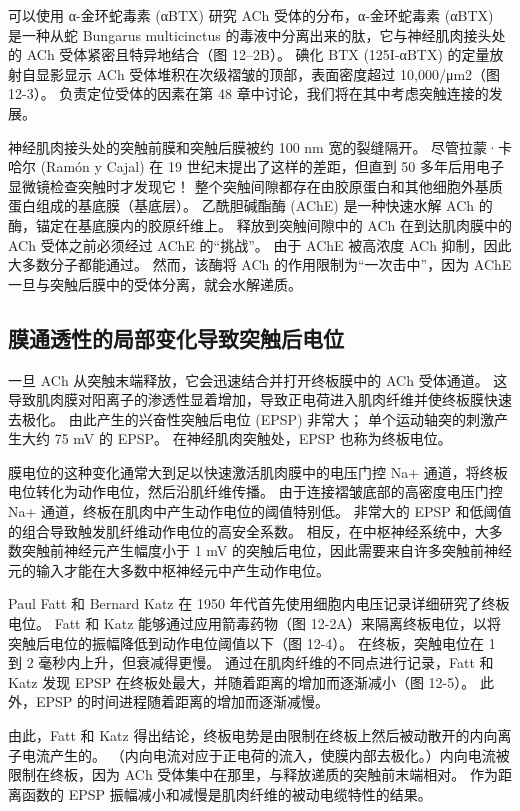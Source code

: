 可以使用 α-金环蛇毒素 (αBTX) 研究 ACh 受体的分布，α-金环蛇毒素 (αBTX) 是一种从蛇 Bungarus multicinctus 的毒液中分离出来的肽，它与神经肌肉接头处的 ACh 受体紧密且特异地结合（图 12–2B）。 碘化 BTX (125I-αBTX) 的定量放射自显影显示 ACh 受体堆积在次级褶皱的顶部，表面密度超过 10,000/μm2（图 12-3）。 负责定位受体的因素在第 48 章中讨论，我们将在其中考虑突触连接的发展。

神经肌肉接头处的突触前膜和突触后膜被约 100 nm 宽的裂缝隔开。 尽管拉蒙·卡哈尔 (Ramón y Cajal) 在 19 世纪末提出了这样的差距，但直到 50 多年后用电子显微镜检查突触时才发现它！ 整个突触间隙都存在由胶原蛋白和其他细胞外基质蛋白组成的基底膜（基底层）。 乙酰胆碱酯酶 (AChE) 是一种快速水解 ACh 的酶，锚定在基底膜内的胶原纤维上。 释放到突触间隙中的 ACh 在到达肌肉膜中的 ACh 受体之前必须经过 AChE 的“挑战”。 由于 AChE 被高浓度 ACh 抑制，因此大多数分子都能通过。 然而，该酶将 ACh 的作用限制为“一次击中”，因为 AChE 一旦与突触后膜中的受体分离，就会水解递质。


\subsection{膜通透性的局部变化导致突触后电位}
一旦 ACh 从突触末端释放，它会迅速结合并打开终板膜中的 ACh 受体通道。 这导致肌肉膜对阳离子的渗透性显着增加，导致正电荷进入肌肉纤维并使终板膜快速去极化。 由此产生的兴奋性突触后电位 (EPSP) 非常大； 单个运动轴突的刺激产生大约 75 mV 的 EPSP。 在神经肌肉突触处，EPSP 也称为终板电位。

膜电位的这种变化通常大到足以快速激活肌肉膜中的电压门控 Na+ 通道，将终板电位转化为动作电位，然后沿肌纤维传播。 由于连接褶皱底部的高密度电压门控 Na+ 通道，终板在肌肉中产生动作电位的阈值特别低。 非常大的 EPSP 和低阈值的组合导致触发肌纤维动作电位的高安全系数。 相反，在中枢神经系统中，大多数突触前神经元产生幅度小于 1 mV 的突触后电位，因此需要来自许多突触前神经元的输入才能在大多数中枢神经元中产生动作电位。

Paul Fatt 和 Bernard Katz 在 1950 年代首先使用细胞内电压记录详细研究了终板电位。 Fatt 和 Katz 能够通过应用箭毒药物（图 12-2A）来隔离终板电位，以将突触后电位的振幅降低到动作电位阈值以下（图 12-4）。 在终板，突触电位在 1 到 2 毫秒内上升，但衰减得更慢。 通过在肌肉纤维的不同点进行记录，Fatt 和 Katz 发现 EPSP 在终板处最大，并随着距离的增加而逐渐减小（图 12-5）。 此外，EPSP 的时间进程随着距离的增加而逐渐减慢。

由此，Fatt 和 Katz 得出结论，终板电势是由限制在终板上然后被动散开的内向离子电流产生的。 （内向电流对应于正电荷的流入，使膜内部去极化。）内向电流被限制在终板，因为 ACh 受体集中在那里，与释放递质的突触前末端相对。 作为距离函数的 EPSP 振幅减小和减慢是肌肉纤维的被动电缆特性的结果。

